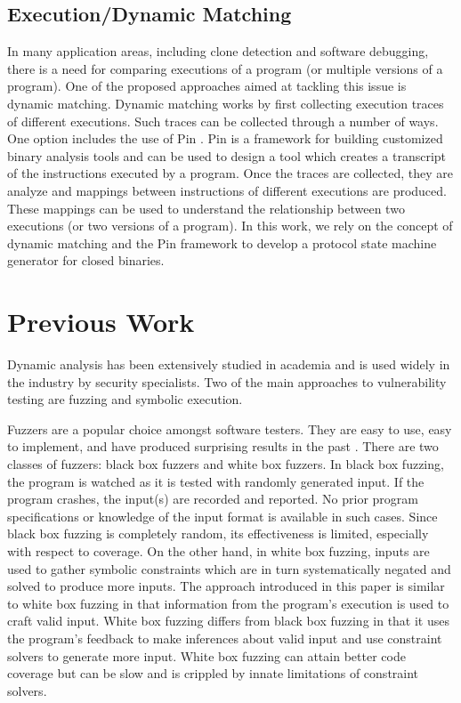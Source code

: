 \documentclass{acm_proc_article-sp}
\begin{document}
\subsection{Execution/Dynamic Matching} \label{bg_dynamicsim}
In many application areas, including clone detection and software debugging, there is a need for comparing executions of a program (or multiple versions of a program).
One of the proposed approaches aimed at tackling this issue is dynamic matching.
Dynamic matching works by first collecting execution traces of different executions.
Such traces can be collected through a number of ways.
One option includes the use of Pin \cite{pintool}.
Pin is a framework for building customized binary analysis tools and can be used to design a tool which creates a transcript of the instructions executed by a program.
Once the traces are collected, they are analyze and mappings between instructions of different executions are produced.
These mappings can be used to understand the relationship between two executions (or two versions of a program).
In this work, we rely on the concept of dynamic matching and the Pin framework to develop a protocol state machine generator for closed binaries.


\section{Previous Work} \label{prevwork}
Dynamic analysis has been extensively studied in academia and is used widely in the industry by security specialists.
Two of the main approaches to vulnerability testing are fuzzing and symbolic execution.

Fuzzers are a popular choice amongst software testers.
They are easy to use, easy to implement, and have produced surprising results in the past \cite{millerfuzz, millerfuzzrevisited}.
There are two classes of fuzzers: black box fuzzers and white box fuzzers.
In black box fuzzing, the program is watched as it is tested with randomly generated input.
If the program crashes, the input(s) are recorded and reported.
No prior program specifications or knowledge of the input format is available in such cases.
Since black box fuzzing is completely random, its effectiveness is limited, especially with respect to coverage.
On the other hand, in white box fuzzing, inputs are used to gather symbolic constraints which are in turn systematically negated and solved to produce more inputs.
The approach introduced in this paper is similar to white box fuzzing in that information from the program's execution is used to craft valid input.
White box fuzzing differs from black box fuzzing in that it uses the program's feedback to make inferences about valid input and use constraint solvers to generate more input.
White box fuzzing can attain better code coverage but can be slow and is crippled by innate limitations of constraint solvers.
\end{document}
